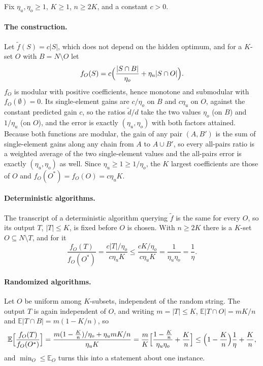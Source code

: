 Fix $\eta_u,\eta_o\ge1$, $K\ge1$, $n\ge2K$, and a constant $c>0$.

\paragraph{The construction.}
Let $\tilde f(S)=c|S|$, which does not depend on the hidden optimum, and for a
$K$-set $O$ with $B=N\setminus O$ let
\[
  f_O(S)=c\Bigl(\frac{|S\cap B|}{\eta_o}+\eta_u|S\cap O|\Bigr).
\]
$f_O$ is modular with positive coefficients, hence monotone and submodular
with $f_O(\emptyset)=0$.  Its single-element gains are $c/\eta_o$ on $B$ and
$c\eta_u$ on $O$, against the constant predicted gain $c$, so the ratios
$\tilde d/d$ take the two values $\eta_o$ (on $B$) and $1/\eta_u$ (on $O$), and
the error is exactly $(\eta_u,\eta_o)$ with both factors attained.  Because
both functions are modular, the gain of any pair $(A,B')$ is the sum of
single-element gains along any chain from $A$ to $A\cup B'$, so every
all-pairs ratio is a weighted average of the two single-element values and the
all-pairs error is exactly $(\eta_u,\eta_o)$ as well.  Since
$\eta_u\ge1\ge1/\eta_o$, the $K$ largest coefficients are those of $O$ and
$f_O(O^{\ast})=f_O(O)=c\eta_uK$.

\paragraph{Deterministic algorithms.}
The transcript of a deterministic algorithm querying $\tilde f$ is the same for
every $O$, so its output $T$, $|T|\le K$, is fixed before $O$ is chosen.  With
$n\ge2K$ there is a $K$-set $O\subseteq N\setminus T$, and for it
\[
  \frac{f_O(T)}{f_O(O^{\ast})}=\frac{c|T|/\eta_o}{c\eta_uK}
  \le\frac{cK/\eta_o}{c\eta_uK}=\frac{1}{\eta_u\eta_o}=\frac1\eta .
\]

\paragraph{Randomized algorithms.}
Let $O$ be uniform among $K$-subsets, independent of the random string.  The
output $T$ is again independent of $O$, and writing $m=|T|\le K$,
$\mathbb E|T\cap O|=mK/n$ and $\mathbb E|T\cap B|=m(1-K/n)$, so
\[
  \mathbb E\Bigl[\frac{f_O(T)}{f_O(O^{\ast})}\Bigr]
  =\frac{m(1-\tfrac Kn)/\eta_o+\eta_u mK/n}{\eta_uK}
  =\frac mK\Bigl[\frac{1-\tfrac Kn}{\eta_u\eta_o}+\frac Kn\Bigr]
  \le\Bigl(1-\frac Kn\Bigr)\frac1\eta+\frac Kn ,
\]
and $\min_O\le\mathbb E_O$ turns this into a statement about one instance.

